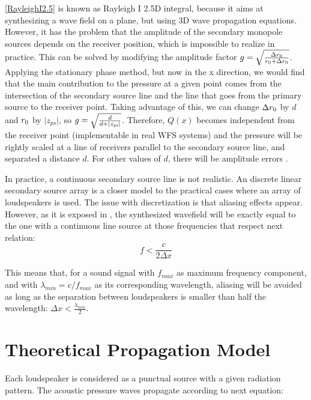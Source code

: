 \autoref{RayleighI2.5} is known as Rayleigh I 2.5D integral, because it aims at synthesizing a wave field on a plane, but using 3D wave propagation equations. However, it has the problem that the amplitude of the secondary monopole sources depends on the receiver position, which is impossible to realize in practice.
This can be solved by modifying the amplitude factor $g = \sqrt{\frac{\Delta r_0}{r_0 + \Delta r_0}}$.
Applying the stationary phase method, but now in the x direction, we would find that the main contribution to the pressure at a given point comes from the intersection of the secondary source line and the line that goes from the primary source to the receiver point. Taking advantage of this, we can change $\Delta r_0$ by $d$ and $r_0$ by $\vert z_\mathit{ps} \vert$, so $g = \sqrt{\frac{d}{d+\vert z_{\PosTheoSubInd[primarySource]} \vert}}$. Therefore, $Q(x)$ becomes independent from the receiver point (implementable in real WFS systems) and the pressure will be rightly scaled at a line of receivers parallel to the secondary source line, and separated a distance $d$. For other values of $d$, there will be amplitude errors \cite{Verheijen}. 

In practice, a continuous secondary source line is not realistic. An discrete linear secondary source array is a closer model to the practical cases where an array of loudspeakers is used. The issue with discretization is that aliasing effects appear. However, as it is exposed in \cite{Start1997}, the synthesized wavefield will be exactly equal to the one with a continuous line source at those frequencies that respect next relation:
\begin{equation}
f < \frac{c}{2\Delta x}
\end{equation}

This means that, for a sound signal with $f_{max}$ as maximum frequency component, and with $\lambda_{min} = c/f_{max}$ as its corresponding wavelength, aliasing will be avoided as long as the separation between loudspeakers is smaller than half the wavelength: $\Delta x < \frac{\lambda_{min}}{2}$.

\section{Theoretical Propagation Model}
\label{TheoreticalModelLabel}

Each loudspeaker is considered as a punctual source with a given radiation pattern. The acoustic pressure waves propagate according to next equation:

